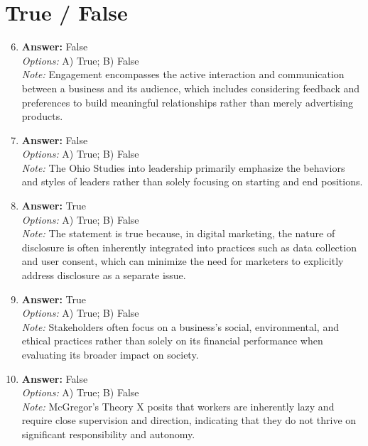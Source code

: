 \documentclass[12pt]{article}
\begin{document}
\section*{True / False}
\begin{enumerate}[label=\arabic*.]
\setcounter{enumi}{5}
\item \textbf{Answer:} False
\\ \textit{Options:} A) True; B) False
\\ \textit{Note:} Engagement encompasses the active interaction and communication between a business and its audience, which includes considering feedback and preferences to build meaningful relationships rather than merely advertising products.
\item \textbf{Answer:} False
\\ \textit{Options:} A) True; B) False
\\ \textit{Note:} The Ohio Studies into leadership primarily emphasize the behaviors and styles of leaders rather than solely focusing on starting and end positions.
\item \textbf{Answer:} True
\\ \textit{Options:} A) True; B) False
\\ \textit{Note:} The statement is true because, in digital marketing, the nature of disclosure is often inherently integrated into practices such as data collection and user consent, which can minimize the need for marketers to explicitly address disclosure as a separate issue.
\item \textbf{Answer:} True
\\ \textit{Options:} A) True; B) False
\\ \textit{Note:} Stakeholders often focus on a business's social, environmental, and ethical practices rather than solely on its financial performance when evaluating its broader impact on society.
\item \textbf{Answer:} False
\\ \textit{Options:} A) True; B) False
\\ \textit{Note:} McGregor's Theory X posits that workers are inherently lazy and require close supervision and direction, indicating that they do not thrive on significant responsibility and autonomy.
\end{enumerate}
\end{document}
